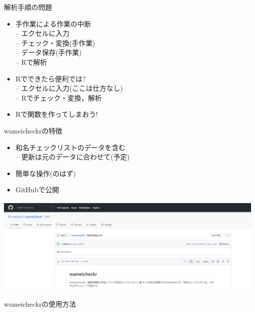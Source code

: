 \documentclass[
  a5paper,
  landscape,
  notitlepage]{report}
\providecommand{\tightlist}{%
  \setlength{\itemsep}{0pt}\setlength{\parskip}{0pt}}
\begin{document}
\newpage

\fontsize{32pt}{32pt}\selectfont

\begin{center}
解析手順の問題
\end{center}

\begin{itemize}
\item
  手作業による作業の中断\\
  -- エクセルに入力\\
  -- チェック・変換(手作業)\\
  -- データ保存(手作業)\\
  -- Rで解析
\item
  Rでできたら便利では?\\
  -- エクセルに入力(ここは仕方なし)\\
  -- Rでチェック・変換，解析
\item
  Rで関数を作ってしまおう!
\end{itemize}

\newpage

\fontsize{32pt}{32pt}\selectfont

\begin{center}
wameicheckrの特徴
\end{center}

\begin{itemize}
\tightlist
\item
  和名チェックリストのデータを含む\\
  -- 更新は元のデータに合わせて(予定)\\
\item
  簡単な操作(のはず)\\
\item
  GitHubで公開
\end{itemize}

\includegraphics{image/wameicheckr.png}

\newpage

\fontsize{32pt}{32pt}\selectfont

\begin{center}
wameicheckrの使用方法
\end{center}
\end{document}
